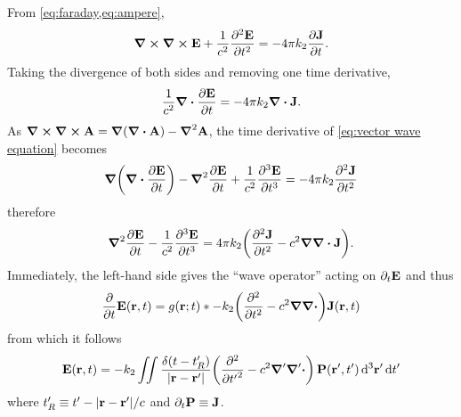 From \cref{eq:faraday,eq:ampere},
\begin{equation}
  \curl{\curl{\vb{E}}} + \frac{1}{c^2} \pdv[2]{\vb{E}}{t} = -4\pi k_2 \pdv{\vb{J}}{t}.
  \label{eq:vector wave equation}
\end{equation}
Taking the divergence of both sides and removing one time derivative,
\begin{equation*}
  \frac{1}{c^2} \div{\pdv{\vb{E}}{t}} = -4 \pi k_2 \div{\vb{J}}.
\end{equation*}
As $\curl{\curl{\vb{A}}} = \grad{\qty(\div{\vb{A}})} - \grad^2{\vb{A}}$, the time derivative of \cref{eq:vector wave equation} becomes
\begin{equation*}
  \grad{\qty(\div{\pdv{\vb{E}}{t}})} - \grad^2 \pdv{\vb{E}}{t} + \frac{1}{c^2} \pdv[3]{\vb{E}}{t} = -4\pi k_2 \pdv[2]{\vb{J}}{t}
\end{equation*}
therefore
\begin{equation*}
  \grad^2 \pdv{\vb{E}}{t} - \frac{1}{c^2} \pdv[3]{\vb{E}}{t} = 4\pi k_2 \qty(\pdv[2]{\vb{J}}{t} - c^2 \grad \div{\vb{J}}).
\end{equation*}
Immediately, the left-hand side gives the ``wave operator'' acting on $\partial_t \vb{E}$ and thus
\begin{equation*}
  \pdv{t} \vb{E}(\vb{r}, t) = g(\vb{r}; t) \ast -k_2\qty(\pdv[2]{t} - c^2 \grad \div) \vb{J}(\vb{r}, t)
\end{equation*}
from which it follows
\begin{equation}
  \vb{E}(\vb{r}, t) = -k_2 \iint \frac{\delta\qty(t - t'_R )}{\abs{\vb{r} - \vb{r}'}} \qty(\pdv[2]{{t'}} - c^2 \grad' \grad'\boldsymbol{\cdot}) \, \vb{P}(\vb{r}', t') \dd[3]{\vb{r}'} \dd{t'}
\end{equation}
where $t'_R \equiv t' - \abs{\vb{r} - \vb{r}'}/c$ and $\partial_t \vb{P} \equiv \vb{J}$.


